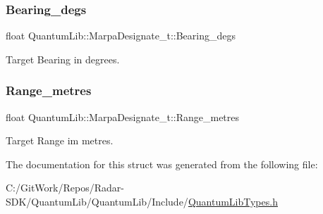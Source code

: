 \subsubsection{\texorpdfstring{Bearing\+\_\+degs}{Bearing\_degs}}
{\footnotesize\ttfamily float Quantum\+Lib\+::\+Marpa\+Designate\+\_\+t\+::\+Bearing\+\_\+degs}



Target Bearing in degrees. 

\mbox{\label{struct_quantum_lib_1_1_marpa_designate__t_a41a6e4f3a89b47f661f26758e35b918c}} 
\subsubsection{\texorpdfstring{Range\+\_\+metres}{Range\_metres}}
{\footnotesize\ttfamily float Quantum\+Lib\+::\+Marpa\+Designate\+\_\+t\+::\+Range\+\_\+metres}



Target Range im metres. 



The documentation for this struct was generated from the following file\+:\begin{DoxyCompactItemize}
\item 
C\+:/\+Git\+Work/\+Repos/\+Radar-\/\+S\+D\+K/\+Quantum\+Lib/\+Quantum\+Lib/\+Include/\mbox{\hyperlink{_quantum_lib_types_8h}{Quantum\+Lib\+Types.\+h}}\end{DoxyCompactItemize}
